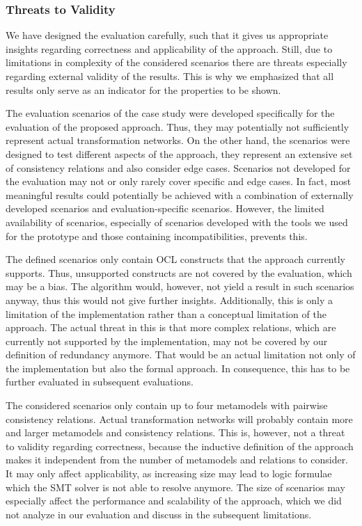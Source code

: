 \subsubsection{Threats to Validity}

We have designed the evaluation carefully, such that it gives us appropriate insights regarding correctness and applicability of the approach.
Still, due to limitations in complexity of the considered scenarios there are threats especially regarding external validity of the results.
This is why we emphasized that all results only serve as an indicator for the properties to be shown.

The evaluation scenarios of the case study were developed specifically for the evaluation of the proposed approach.
Thus, they may potentially not sufficiently represent actual transformation networks.
On the other hand, the scenarios were designed to test different aspects of the approach, they represent an extensive set of consistency relations and also consider edge cases.
Scenarios not developed for the evaluation may not or only rarely cover specific and edge cases.
In fact, most meaningful results could potentially be achieved with a combination of externally developed scenarios and evaluation-specific scenarios.
However, the limited availability of scenarios, especially of scenarios developed with the tools we used for the prototype and those containing incompatibilities, prevents this.

The defined scenarios only contain \gls{OCL} constructs that the approach currently supports.
Thus, unsupported constructs are not covered by the evaluation, which may be a bias.
The algorithm would, however, not yield a result in such scenarios anyway, thus this would not give further insights.
Additionally, this is only a limitation of the implementation rather than a conceptual limitation of the approach.
The actual threat in this is that more complex relations, which are currently not supported by the implementation, may not be covered by our definition of redundancy anymore.
That would be an actual limitation not only of the implementation but also the formal approach.
In consequence, this has to be further evaluated in subsequent evaluations.

The considered scenarios only contain up to four metamodels with pairwise consistency relations.
Actual transformation networks will probably contain more and larger metamodels and consistency relations.
This is, however, not a threat to validity regarding correctness, because the inductive definition of the approach makes it independent from the number of metamodels and relations to consider.
It may only affect applicability, as increasing size may lead to logic formulae which the \gls{SMT} solver is not able to resolve anymore.
The size of scenarios may especially affect the performance and scalability of the approach, which we did not analyze in our evaluation and discuss in the subsequent limitations.

